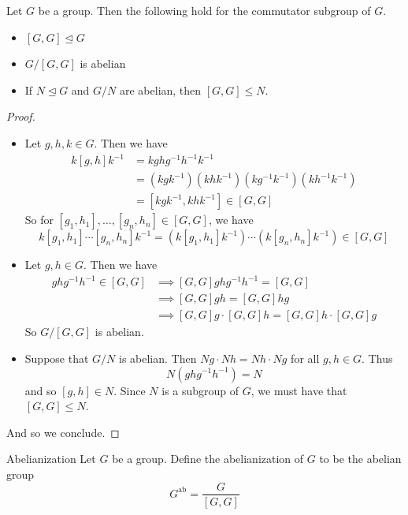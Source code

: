 \documentclass[a4paper]{article}
\begin{document}
\begin{prp}{}{} Let $G$ be a group. Then the following hold for the commutator subgroup of $G$. 
\begin{itemize}
\item $[G,G]\trianglelefteq G$
\item $G/[G,G]$ is abelian
\item If $N\trianglelefteq G$ and $G/N$ are abelian, then $[G,G]\leq N$. 
\end{itemize} 
\begin{proof}~\\
\begin{itemize}
\item Let $g,h,k\in G$. Then we have 
\begin{align*}
k[g,h]k^{-1}&=kghg^{-1}h^{-1}k^{-1}\\
&=\left(kgk^{-1}\right)\left(khk^{-1}\right)\left(kg^{-1}k^{-1}\right)\left(kh^{-1}k^{-1}\right)\\
&=[kgk^{-1},khk^{-1}]\in[G,G]
\end{align*}
So for $[g_1,h_1],\dots,[g_n,h_n]\in[G,G]$, we have $$k[g_1,h_1]\cdots[g_n,h_n]k^{-1}=\left(k[g_1,h_1]k^{-1}\right)\cdots\left(k[g_n,h_n]k^{-1}\right)\in[G,G]$$
\item Let $g,h\in G$. Then we have 
\begin{align*}
ghg^{-1}h^{-1}\in[G,G]&\implies [G,G]ghg^{-1}h^{-1}=[G,G]\\
&\implies [G,G]gh=[G,G]hg\\
&\implies [G,G]g\cdot[G,G]h=[G,G]h\cdot[G,G]g
\end{align*}
So $G/[G,G]$ is abelian. 
\item Suppose that $G/N$ is abelian. Then $Ng\cdot Nh=Nh\cdot Ng$ for all $g,h\in G$. Thus $$N(ghg^{-1}h^{-1})=N$$ and so $[g,h]\in N$. Since $N$ is a subgroup of $G$, we must have that $[G,G]\leq N$. 
\end{itemize}
And so we conclude. 
\end{proof}
\end{prp}

\begin{defn}{Abelianization}{} Let $G$ be a group. Define the abelianization of $G$ to be the abelian group $$G^\text{ab}=\frac{G}{[G,G]}$$
\end{defn}
\end{document}
